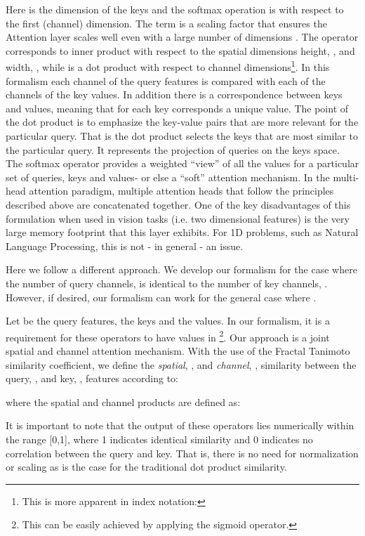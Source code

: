 \documentclass[times, 5p]{elsarticle}
\begin{document}
Here  is the dimension of the keys and the softmax operation is with respect to the first (channel) dimension. The term  is a scaling factor that ensures the Attention layer scales well even with a large number of dimensions  \citep{DBLP:journals/corr/VaswaniSPUJGKP17}. The operator  corresponds to inner product with respect to  the spatial dimensions height, , and width, , while  is a dot product with respect to channel dimensions\footnote{This is more apparent in index notation: 
}.
In this formalism each channel of the query features is compared with each of the channels of the key values. In addition there is a  correspondence between keys and values, meaning that for each key corresponds a unique value.  
The point of the dot product is to emphasize the key-value pairs that are more relevant for the particular query. That is the dot product selects the keys  that are most similar to the particular query. It represents the projection of queries on the keys space. The softmax operator provides a weighted ``view'' of all the values for a particular set of queries, keys and values- or else a ``soft'' attention mechanism. In the multi-head attention paradigm, multiple attention heads that follow the principles described above are concatenated together. One of the key disadvantages of this formulation when used in vision tasks (i.e. two dimensional features) is the very large memory footprint that this layer exhibits. For 1D problems, such as Natural Language Processing, this is not - in general - an issue. 


Here we follow a different approach.  We develop our formalism for the case where the number of query channels,  is identical to the number of key channels, . However, if desired, our formalism can work for the general case where . 

Let  be the query features,  the keys and  the values. In our formalism, it is a requirement for these operators to have values in \footnote{This can be easily achieved by applying the sigmoid operator.}. Our approach is a joint spatial and channel attention mechanism. With the use of the Fractal Tanimoto similarity coefficient, we define the \emph{spatial}, , and \emph{channel}, , similarity between the query, , and key, , features according to:

where the spatial and channel products are defined as: 

It is important to note that the output of these operators lies numerically within the range [0,1], where 1 indicates identical similarity and 0 indicates no correlation between the query and key. That is, there is no need for normalization or scaling as is the case for the traditional dot product similarity. 
\end{document}
